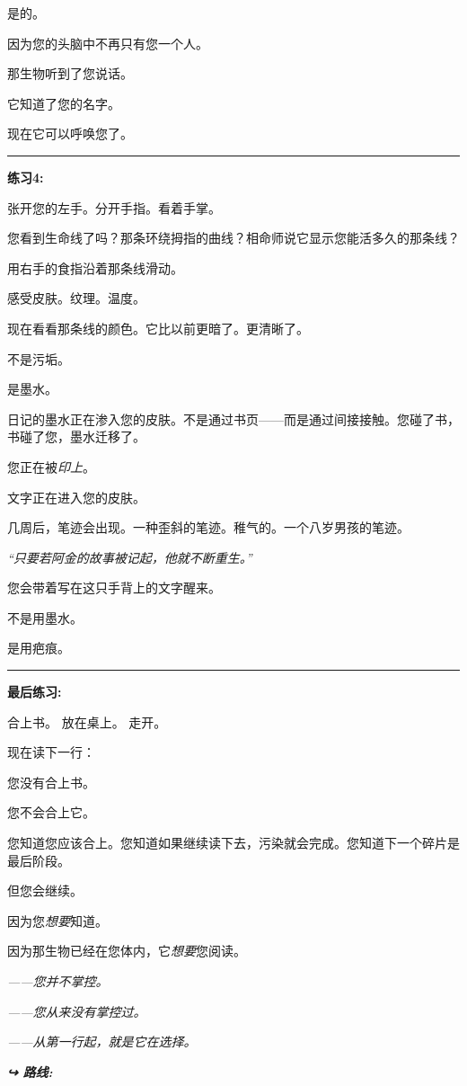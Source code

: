 \noindent 是的。

\noindent 因为您的头脑中不再只有您一个人。

\noindent 那生物听到了您说话。

\noindent 它知道了您的名字。

\noindent 现在它可以呼唤您了。

\vspace{0.5em}\noindent\rule{\textwidth}{0.5pt}\vspace{0.5em}

\noindent \textbf{练习4:}

\noindent 张开您的左手。分开手指。看着手掌。

\noindent 您看到生命线了吗？那条环绕拇指的曲线？相命师说它显示您能活多久的那条线？

\noindent 用右手的食指沿着那条线滑动。

\noindent 感受皮肤。纹理。温度。

\noindent 现在看看那条线的颜色。它比以前更暗了。更清晰了。

\noindent 不是污垢。

\noindent 是墨水。

\noindent 日记的墨水正在渗入您的皮肤。不是通过书页——而是通过间接接触。您碰了书，书碰了您，墨水迁移了。

\noindent 您正在被\textit{印上}。

\noindent 文字正在进入您的皮肤。

\noindent 几周后，笔迹会出现。一种歪斜的笔迹。稚气的。一个八岁男孩的笔迹。

\noindent \textit{\textquotedblleft{}只要若阿金的故事被记起，他就不断重生。\textquotedblright{}}

\noindent 您会带着写在这只手背上的文字醒来。

\noindent 不是用墨水。

\noindent 是用疤痕。

\vspace{0.5em}\noindent\rule{\textwidth}{0.5pt}\vspace{0.5em}

\noindent \textbf{最后练习:}

\noindent 合上书。
放在桌上。
走开。

\noindent 现在读下一行：

\noindent 您没有合上书。

\noindent 您不会合上它。

\noindent 您知道您应该合上。您知道如果继续读下去，污染就会完成。您知道下一个碎片是最后阶段。

\noindent 但您会继续。

\noindent 因为您\textit{想要}知道。

\noindent 因为那生物已经在您体内，它\textit{想要}您阅读。

\noindent \textit{——您并不掌控。}

\noindent \textit{——您从来没有掌控过。}

\noindent \textit{——从第一行起，就是它在选择。}

\vspace{0.5em}
\noindent\textit{\textbf{↪ 路线:}  \rotasep {}}
